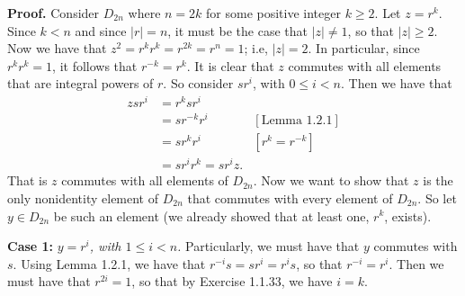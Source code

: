 \documentclass[9pt]{article}
\begin{document}
\begin{enumerate}
      \textbf{Proof.} Consider $D_{2n}$ where $n = 2k$ for some positive integer
      $k \ge 2$. Let $z = r^k$. Since $k < n$ and since $|r| = n$, it must be
      the case that $|z| \neq 1$, so that $|z| \ge 2$. Now we have that
      $z^2 = r^kr^k = r^{2k} = r^n = 1$; i.e, $|z| = 2$. In particular, since
      $r^kr^k = 1$, it follows that $r^{-k} = r^k$. It is clear that $z$
      commutes with all elements that are integral powers of $r$. So consider
      $sr^i$, with $0 \le i < n$. Then we have that
      \begin{align*}
         zsr^i &= r^ksr^i \\
               &= sr^{-k}r^i  &[\text{Lemma 1.2.1}] \\
               &= sr^kr^i     &[r^k = r^{-k}] \\
               &= sr^ir^k = sr^iz.
      \end{align*}
      That is $z$ commutes with all elements of $D_{2n}$. Now we want to show
      that $z$ is the only nonidentity element of $D_{2n}$ that commutes with
      every element of $D_{2n}$. So let $y \in D_{2n}$ be such an element (we
      already showed that at least one, $r^k$, exists).
      
      \textbf{Case 1:} \textit{$y = r^i$, with $1 \le i < n$.} Particularly, we
      must have that $y$ commutes with $s$. Using Lemma 1.2.1, we have that
      $r^{-i}s = sr^i = r^is$, so that $r^{-i} = r^i$. Then we must have that
      $r^{2i} = 1$, so that by Exercise 1.1.33, we have $i = k$.
      

\end{enumerate}
\end{document}
